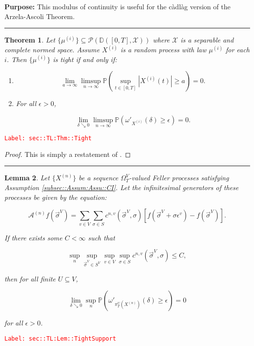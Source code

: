 \documentclass[12pt]{article}
\newcommand{\mb}{\mathbb}
\newcommand{\mc}{\mathcal}
\newcommand{\ra}{\rightarrow}
\newcommand{\ep}{\epsilon}
\newcommand{\tr}{\textcolor{red}}
\newcommand{\labe}[1]{\tr{\texttt{Label: #1}}}
\newcommand{\purpose}{\textbf{Purpose: }}
\newcommand{\lin}{\rule{\linewidth}{0.4 pt}}
\newcommand{\pr}{\mb{P}}							%
\newcommand{\cad}{\mb{D}}							%
\renewcommand{\v}{v}							%
\renewcommand{\U}{U}							%
\renewcommand{\S}{S}							%
\newcommand{\s}{\sigma}							%
\newcommand{\sv}{\vec{\s}}						%
\newcommand{\ev}{\ep}							%
\newcommand{\T}{T}								%
\renewcommand{\t}{t}							%
\newcommand{\sset}{\Omega}						%
\newcommand{\proj}{\pi}							%
\newcommand{\X}{X}								%
\newcommand{\IG}{\mc{A}}						%
\newcommand{\IGr}{c}							%
\newcommand{\vind}[1]{^{#1}}					%
\newcommand{\carp}[1]{^{#1}}					%
\newcommand{\vsi}[1]{^{#1}}						%
\newcommand{\tp}[1]{(#1)}						%
\newcommand{\ts}[1]{_{#1}}						%
\newcommand{\slnvind}[2]{^{#1,#2}}				%
\newcommand{\const}{C}							%
\newcommand{\sln}[1]{^{(#1)}}					%
\newcommand{\cmodu}{\omega'}					%
\newcommand{\pra}[1]{_{#1}}						%
\newcommand{\m}{\mu}							%
\newcommand{\spce}{\mc{X}}						%
\newtheorem{thms}{Theorem}[section]
\newtheorem{lem}[thms]{Lemma}
\begin{document}
\purpose This modulus of continuity is useful for the c\`adl\`ag version of the Arzela-Ascoli Theorem.

\lin

\begin{thms}
Let \(\{\m\sln{i}\}\subseteq \mc{P}\left(\cad([0,T],\spce)\right)\) where \(\spce\) is a separable and complete normed space. Assume \(\X\sln{i}\) is a random process with law \(\m\sln{i}\) for each \(i\). Then \(\{\m\sln{i}\}\) is tight if and only if:

\begin{enumerate}[(1)]
\item 

\[\lim_{a \ra \infty}\limsup_{n \ra\infty} \pr\left(\sup_{\t \in [0,T]} |\X\sln{i}\tp{\t}| \geq a\right) = 0.\]

\item For all \(\ep > 0\),

\[\lim_{\delta \searrow 0}\limsup_{n\ra\infty} \pr\left(\cmodu\pra{\X\sln{i}}(\delta) \geq \ep\right) = 0.\]
\end{enumerate}
\label{sec::TL:Thm::Tight}
\end{thms}
\labe{sec::TL:Thm::Tight}

\begin{proof}
This is simply a restatement of \cite[Theorem 13.2]{Bil99}.
\end{proof}

\lin

\begin{lem}
Let \(\{\X\sln{n}\}\) be a sequence \(\sset\vsi{V}\ts{\T}\)-valued Feller processes satisfying Assumption \ref{subsec::Assum:Assu::CI}. Let the infinitesimal generators of these processes be given by the equation:

\[\IG\sln{n}f(\sv\vsi{V}) = \sum_{\v\in V}\sum_{\s \in \S} \IGr\slnvind{n}{\v}(\sv\vsi{V},\s)[f(\sv\vsi{V} + \s\ev\vind{\v}) - f(\sv\vsi{V})].\]

If there exists some \(\const < \infty\) such that

\[\sup_{n}\sup_{\sv\vsi{V}\in \S\carp{V}}\sup_{\v\in V}\sup_{\s\in \S} \IGr\slnvind{n}{\v}(\sv\vsi{V},\s) \leq \const,\]

then for all finite \(\U \subseteq V\),

\[\lim_{\delta \searrow 0} \sup_n \pr\left(\cmodu\pra{\proj\vsi{\U}\ts{\T}\left(\X\sln{n}\right)}(\delta) \geq \ep\right) = 0\]

for all \(\ep > 0\).
\label{sec::TL:Lem::TightSupport}
\end{lem}
\labe{sec::TL:Lem::TightSupport}
\end{document}
